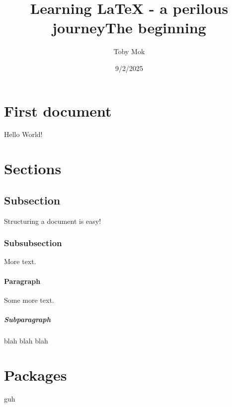 \documentclass{article}
\title{Learning LaTeX - a perilous journey}
\date{9/2/2025}
\author{Toby Mok}
\begin{document}

\maketitle
{}

\newpage
\doublespacing
\tableofcontents
\singlespacing

\newpage
{}

\title{The beginning}

\section{First document}
Hello World!

\section{Sections}
\subsection{Subsection}
Structuring a document is easy!

\subsubsection{Subsubsection}
More text.

\paragraph{Paragraph}
Some more text.

\subparagraph{Subparagraph}
blah blah blah

\section{Packages}
guh
\end{document}
